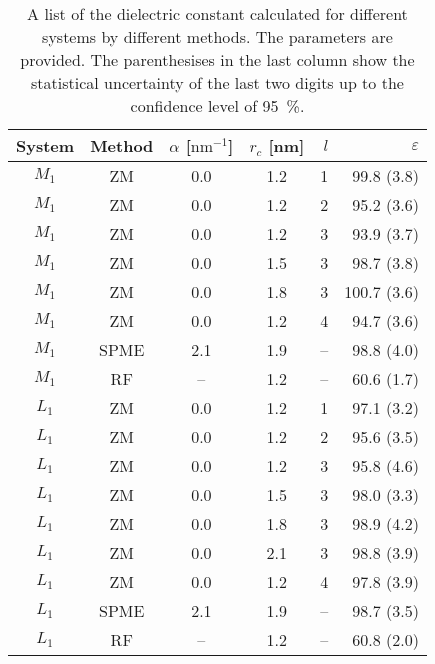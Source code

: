 \documentclass[aip,jcp,a4paper,reprint,unsortedaddress,onecolumn,fleqn]{revtex4}
\newcommand{\eps}{\varepsilon}
\newcommand{\systemmb}{M_1}
\newcommand{\systemlb}{L_1}
\begin{document}
\begin{table}
  \centering
  \caption{A list of the dielectric constant calculated for different systems by different methods.
    The parameters are provided. The parenthesises in the last column show the statistical uncertainty
    of the last two digits up to the confidence level of 95~\%.}
  \begin{tabular*}{0.8\textwidth}{@{\extracolsep{\fill}}cccc rr}\hline\hline
    System & Method      &       $\alpha$ [$\textrm{nm}^{-1}$] & $r_c$ [nm] &    $l$     &       $\eps$ \\\hline
    $\systemmb$  &       ZM          &       0.0    &       1.2     &       1       &       99.8 (3.8)\\ 
    $\systemmb$  &       ZM          &       0.0    &       1.2     &       2       &       95.2 (3.6)\\ 
    $\systemmb$  &       ZM          &       0.0    &       1.2     &       3       &       93.9 (3.7)\\ 
    $\systemmb$  &       ZM          &       0.0    &       1.5     &       3       &       98.7 (3.8)\\ 
    $\systemmb$  &       ZM          &       0.0    &       1.8     &       3       &      100.7 (3.6)\\ 
    $\systemmb$  &       ZM          &       0.0    &       1.2     &       4       &       94.7 (3.6)\\
    $\systemmb$   & SPME          & 2.1  & 1.9   &       --      &       98.8 (4.0) \\
    $\systemmb$  & RF             & --  & 1.2 & -- & 60.6   (1.7) \\\hline
    $\systemlb$  &       ZM          &       0.0    &       1.2     &       1       &       97.1 (3.2)\\ 
    $\systemlb$  &       ZM          &       0.0    &       1.2     &       2       &       95.6 (3.5)\\ 
    $\systemlb$  &       ZM          &       0.0    &       1.2     &       3       &       95.8 (4.6)\\ 
    $\systemlb$  &       ZM          &       0.0    &       1.5     &       3       &       98.0 (3.3)\\ 
    $\systemlb$  &       ZM          &       0.0    &       1.8     &       3       &       98.9 (4.2)\\ 
    $\systemlb$  &       ZM          &       0.0    &       2.1     &       3       &       98.8 (3.9)\\ 
    $\systemlb$  &       ZM          &       0.0    &       1.2     &       4       &       97.8 (3.9)\\
   $\systemlb$   & SPME          & 2.1  & 1.9   &       --      &       98.7 (3.5) \\
    $\systemlb$  & RF             & --  & 1.2 & -- & 60.8   (2.0) \\
    \hline\hline
  \end{tabular*}
  \label{tab:tmp2}
\end{table}
\end{document}
